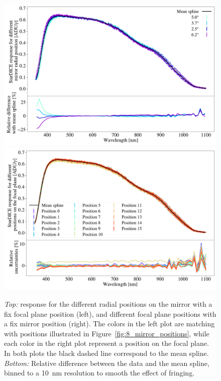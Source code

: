 \begin{figure}[h!]
    \centering
    \includegraphics[width=\columnwidth]{fig/radial_positions.pdf}
    \includegraphics[width=\columnwidth]{fig/ccd_positions.pdf}
    \caption{\textit{Top:} \SD response for the different radial positions on the mirror with a fix focal plane position (left), and different focal plane positions  with a fix mirror position (right). The colors in the left plot are matching with positions illustrated in Figure~\ref{fig:8_mirror_positions}, while each color in the right plot represent a position on the focal plane. In both plots the black dashed line correspond to the mean spline. \textit{Bottom:} Relative difference between the data and the mean spline, binned to a \SI{10}{\nano\meter} resolution to smooth the effect of fringing.}
    \label{fig:radial_positions}
\end{figure}

